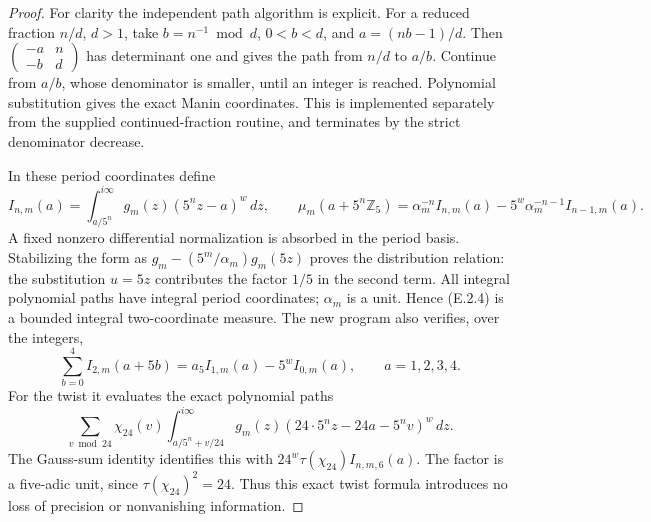 \begin{proof}
For clarity the independent path algorithm is explicit.
For a reduced fraction \(n/d\), \(d>1\), take
\(b=n^{-1}\bmod d\), \(0<b<d\), and
\(a=(nb-1)/d\). Then
\(\left(\begin{smallmatrix}-a&n\\-b&d\end{smallmatrix}\right)\)
has determinant one and gives the path from \(n/d\) to
\(a/b\). Continue from \(a/b\), whose denominator is
smaller, until an integer is reached. Polynomial
substitution gives the exact Manin coordinates. This is
implemented separately from the supplied continued-fraction
routine, and terminates by the strict denominator decrease.

In these period coordinates define
\[
 I_{n,m}(a)=\int_{a/5^n}^{i\infty}
             g_m(z)(5^nz-a)^w\,dz,
\qquad
 \mu_m(a+5^n\mathbb Z_5)
 =\alpha_m^{-n}I_{n,m}(a)
  -5^w\alpha_m^{-n-1}I_{n-1,m}(a).                    \tag{E.2.4}
\]
A fixed nonzero differential normalization is absorbed in
the period basis. Stabilizing the form as
\(g_m-(5^m/\alpha_m)g_m(5z)\) proves the distribution
relation: the substitution \(u=5z\) contributes the
factor \(1/5\) in the second term. All integral polynomial
paths have integral period coordinates; \(\alpha_m\) is
a unit. Hence (E.2.4) is a bounded integral two-coordinate
measure. The new program also verifies, over the integers,
\[
 \sum_{b=0}^4 I_{2,m}(a+5b)
 =a_5I_{1,m}(a)-5^w I_{0,m}(a),\qquad a=1,2,3,4.       \tag{E.2.5}
\]
For the twist it evaluates the exact polynomial paths
\[
 \sum_{v\bmod24}\chi_{24}(v)
 \int_{a/5^n+v/24}^{i\infty}
 g_m(z)(24\cdot5^nz-24a-5^nv)^w\,dz.                 \tag{E.2.6}
\]
The Gauss-sum identity identifies this with
\(24^w\tau(\chi_{24})I_{n,m,6}(a)\).
The factor is a five-adic unit, since
\(\tau(\chi_{24})^2=24\). Thus this exact twist formula
introduces no loss of precision or nonvanishing information.


\end{proof}
